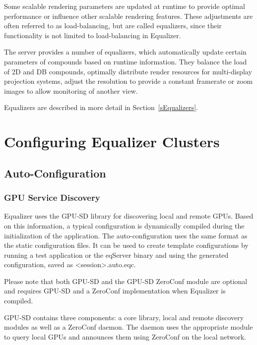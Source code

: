 \documentclass[10pt,a4]{scrartcl}
\newcommand{\sref}[1]{Section~\ref{#1}}
\begin{document}
Some scalable rendering parameters are updated at runtime to provide
optimal performance or influence other scalable rendering
features. These adjustments are often referred to as load-balancing, but
are called \textsf{equalizers}, since their functionality is not limited
to load-balancing in Equalizer.

The server provides a number of equalizers, which automatically update
certain parameters of compounds based on runtime information. They
balance the load of 2D and DB compounds, optimally distribute render
resources for multi-display projection systems, adjust the resolution
to provide a constant framerate or zoom images to allow monitoring of
another view.

Equalizers are described in more detail in \sref{sEqualizers}.


\section{\label{sConfig}Configuring Equalizer Clusters}

\subsection{\label{sAutoConfig}Auto-Configuration}

\subsubsection{GPU Service Discovery}

Equalizer uses the GPU-SD library for discovering local and remote GPUs. Based
on this information, a typical configuration is dynamically compiled during the
initialization of the application. The auto-configuration uses the same format
as the static configuration files. It can be used to create template
configurations by running a test application or the eqServer binary and using
the generated configuration, saved as \textless session\textgreater.auto.eqc.

Please note that both GPU-SD and the GPU-SD ZeroConf module are optional and
requires GPU-SD and a ZeroConf implementation when Equalizer is compiled.

GPU-SD contains three components: a core library, local and remote discovery
modules as well as a ZeroConf daemon. The daemon uses the appropriate module to
query local GPUs and announces them using ZeroConf on the local network.
\end{document}
